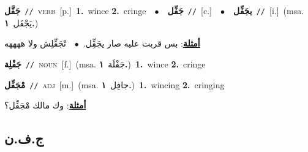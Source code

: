 \documentclass[10pt,a4paper,twoside]{article} %
\begin{document}
\begin{multicols}{2}
{\setlength\topsep{0pt}\textbf{\foreignlanguage{arabic}{جَفَّل}}\ {\color{gray}\texttt{//}\color{black}}\ \textsc{verb}\ [p.]\ \textbf{1.}~wince  \textbf{2.}~cringe\ \ $\bullet$\ \ \setlength\topsep{0pt}\textbf{\foreignlanguage{arabic}{جَفِّل}}\ {\color{gray}\texttt{//}\color{black}}\ [c.]\ \ $\bullet$\ \ \setlength\topsep{0pt}\textbf{\foreignlanguage{arabic}{يجَفِّل}}\ {\color{gray}\texttt{//}\color{black}}\ [i.]\ \color{gray}(msa. \foreignlanguage{arabic}{يَجْفَل}~\foreignlanguage{arabic}{\textbf{١.}})\color{black}\  \begin{flushright}\color{gray}\foreignlanguage{arabic}{\textbf{\underline{\foreignlanguage{arabic}{أمثلة}}}: بس قربت عليه صار يجَفِِّل.\ $\bullet$\ \  تْجَفِّلِش ولا ههههه}\end{flushright}\color{black}} \vspace{2mm}

{\setlength\topsep{0pt}\textbf{\foreignlanguage{arabic}{جَفْلِة}}\ {\color{gray}\texttt{//}\color{black}}\ \textsc{noun}\ [f.]\ \color{gray}(msa. \foreignlanguage{arabic}{جَفْلَة}~\foreignlanguage{arabic}{\textbf{١.}})\color{black}\ \textbf{1.}~wince  \textbf{2.}~cringe\ } \vspace{2mm}

{\setlength\topsep{0pt}\textbf{\foreignlanguage{arabic}{مْجَفِّل}}\ {\color{gray}\texttt{//}\color{black}}\ \textsc{adj}\ [m.]\ \color{gray}(msa. \foreignlanguage{arabic}{جافِل}~\foreignlanguage{arabic}{\textbf{١.}})\color{black}\ \textbf{1.}~wincing  \textbf{2.}~cringing\  \begin{flushright}\color{gray}\foreignlanguage{arabic}{\textbf{\underline{\foreignlanguage{arabic}{أمثلة}}}: وك مالك مْجَفِّل؟}\end{flushright}\color{black}} \vspace{2mm}

\vspace{-3mm}
\subsection*{\color{blue}\foreignlanguage{arabic}{ج.ف.ن}\color{blue}{}} 


\end{multicols}
\end{document}
